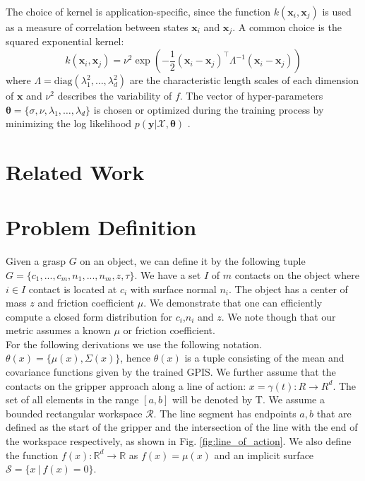 \documentclass[letterpaper, 10 pt, conference]{ieeeconf}  %
\newcommand{\by}{\mathbf{y}}
\newcommand{\bx}{\mathbf{x}}
\newcommand{\mX}{\mathcal{X}}
\begin{document}
The choice of kernel is application-specific, since the function $k(\bx_i,\bx_j)$ is used as a measure of correlation between states $\bx_i$ and $\bx_j$.
A common choice is the squared exponential kernel:
\begin{equation}
k(\bx_i,\bx_j) 
=
\nu^2\exp(-\frac{1}{2}(\bx_i - \bx_j)^{\intercal}\Lambda^{-1}(\bx_i - \bx_j))
\end{equation}
where $\Lambda= \text{diag}(\lambda_1^2,\ldots,\lambda_d^2)$ are the characteristic length scales of each dimension of $\bx$ and $\nu^2$ describes the variability of $f$.
The vector of hyper-parameters $\boldsymbol{\theta} = \{\sigma,\nu,\lambda_1,\ldots,\lambda_d\}$ is chosen or optimized during the training process by minimizing the log likelihood $p(\by|\mX,\boldsymbol{\theta})$ \cite{rasmussen2006}.

\section{Related Work}

\section{Problem Definition}
Given a grasp $G$ on an object, we can define it by the following tuple $G = \lbrace c_1,...,c_m,n_1,...,n_m,z,\tau\rbrace$. We have a set $I$ of $m$ contacts on the object where $i \in I$ contact is located at $c_i$ with surface normal $n_i$.
The object has a center of mass $z$ and friction coefficient $\mu$.
We demonstrate that one can efficiently compute a closed form distribution for $c_i$,$n_i$ and $z$.
We note though that our metric assumes a known $\mu$ or friction coefficient. \\


 For the following derivations we use the following notation.
 $\theta(x) = \lbrace \mu(x),\Sigma(x) \rbrace$, hence $\theta(x)$ is a tuple consisting of the mean and covariance functions given by the trained GPIS.
We further assume that the contacts on the gripper approach along a line of action: $x = \gamma(t): R \rightarrow R^d$. The set of all elements in the range $[a,b]$ will be denoted by T. 
We assume a bounded rectangular workspace $\mathcal{R}$.
The line segment has endpoints $a,b$ that are defined as the start of the gripper and the intersection of the line with the end of the workspace respectively, as shown in Fig.
 \ref{fig:line_of_action}.
 We also define the function $f(x): \mathbb{R}^d \rightarrow \mathbb{R}$ as $f(x) = \mu(x)$ and an implicit surface $\mathcal{S} = \{ x \ | \ f(x) = 0 \}$.
\end{document}
